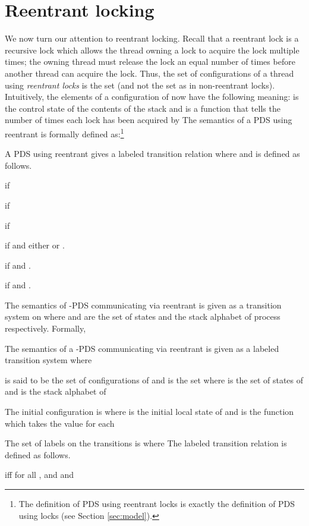 \documentclass{LMCS}
\begin{document}
\section{Reentrant locking}
\label{sec:reentrant}
We now turn our attention to reentrant locking. Recall that a reentrant lock is a recursive lock which allows the thread owning a lock
to acquire the lock multiple times; the owning thread must release the lock an equal number of times before another thread can acquire
the lock.  Thus, the  set of configurations of a  thread   using \emph{reentrant locks} is the set 
(and not the set   as in non-reentrant locks).  Intuitively, the elements of a configuration  of  now have the following meaning:  is the control state of   the contents of the stack and  is a function that tells the number of times each lock has been acquired by  The
semantics of a PDS  using reentrant  is formally defined as:\footnote{The definition of PDS  using reentrant locks  is exactly the definition of PDS  using locks  (see Section \ref{sec:model}).} 
 \begin{definition}
 A PDS  using reentrant  gives  a labeled
 transition relation  where  and
  is defined as follows.
 \begin{iteMize}{}
 \item  if 
 \item  if 
 \item  if 
 \item  if  and either  or .
 \item  if   and
 .

 \item  if   and
 .
 \end{iteMize}
 \end{definition}
 
The semantics of -PDS  communicating via reentrant  is given as a
transition system on  
where  and  are the set of states and the stack alphabet  of process  respectively. Formally,
\begin{definition}
The semantics of a -PDS  communicating via reentrant   is given as a labeled transition system  where
\begin{iteMize}{}
\item  is said to be the set of configurations of  and  is the set  where  is the set of  states of  and  is the stack alphabet of 
\item The initial configuration  is   where  is the initial local state of  and  is the function which takes the value  for each 


\item The set of labels on the transitions  is  where 
The labeled transition relation  is defined as follows.

iff  for all ,
        and  and  
      
\end{iteMize}
\end{definition}
\end{document}
